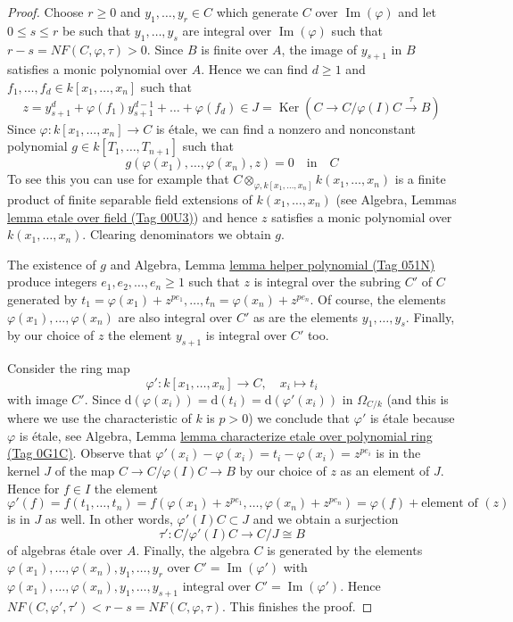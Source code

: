 \documentclass{amsart}
\theoremstyle{plain}
\theoremstyle{definition}
\theoremstyle{remark}
\numberwithin{equation}{subsection}
\def\Ker{\mathop{\mathrm{Ker}}}
\def\Im{\mathop{\mathrm{Im}}}
\begin{document}
\begin{proof}
Choose $r \geq 0$ and $y_1, \ldots, y_r \in C$ which generate
$C$ over $\Im(\varphi)$ and let $0 \leq s \leq r$ be such that
$y_1, \ldots, y_s$ are integral over $\Im(\varphi)$
such that $r - s = NF(C, \varphi, \tau) > 0$.
Since $B$ is finite over $A$, the image of $y_{s + 1}$ in $B$
satisfies a monic polynomial over $A$. Hence we can find
$d \geq 1$ and $f_1, \ldots, f_d \in k[x_1, \ldots, x_n]$
such that
$$
z = y_{s + 1}^d + \varphi(f_1) y_{s + 1}^{d - 1} + \ldots + \varphi(f_d) \in
J = \Ker(C \to C/\varphi(I)C \xrightarrow{\tau} B)
$$
Since $\varphi : k[x_1, \ldots, x_n] \to C$ is \'etale, we can find a
nonzero and nonconstant polynomial $g \in k[T_1, \ldots, T_{n + 1}]$
such that
$$
g(\varphi(x_1), \ldots, \varphi(x_n), z) = 0
\quad\text{in}\quad
C
$$
To see this you can use for example that
$C \otimes_{\varphi, k[x_1, \ldots, x_n]} k(x_1, \ldots, x_n)$
is a finite product of finite separable field extensions
of $k(x_1, \ldots, x_n)$
(see Algebra, Lemmas \href{https://stacks.math.columbia.edu/tag/00U3}{lemma etale over field (Tag 00U3)})
and hence $z$ satisfies a monic
polynomial over $k(x_1, \ldots, x_n)$. Clearing denominators
we obtain $g$.

\medskip\noindent
The existence of $g$ and
Algebra, Lemma \href{https://stacks.math.columbia.edu/tag/051N}{lemma helper polynomial (Tag 051N)}
produce integers $e_1, e_2, \ldots, e_n \geq 1$ such that
$z$ is integral over the subring $C'$ of $C$ generated by
$t_1 = \varphi(x_1) + z^{pe_1}, \ldots, t_n = \varphi(x_n) + z^{pe_n}$.
Of course, the elements $\varphi(x_1), \ldots, \varphi(x_n)$
are also integral over $C'$ as are the elements
$y_1, \ldots, y_s$. Finally, by our choice of $z$ the element
$y_{s + 1}$ is integral over $C'$ too.

\medskip\noindent
Consider the ring map
$$
\varphi' : k[x_1, \ldots, x_n] \longrightarrow C, \quad
x_i \longmapsto t_i
$$
with image $C'$. Since
$\text{d}(\varphi(x_i)) = \text{d}(t_i) = \text{d}(\varphi'(x_i))$
in $\Omega_{C/k}$ (and this is where we use the characteristic of $k$
is $p > 0$) we conclude that $\varphi'$ is \'etale because $\varphi$ is
\'etale, see
Algebra, Lemma \href{https://stacks.math.columbia.edu/tag/0G1C}{lemma characterize etale over polynomial ring (Tag 0G1C)}.
Observe that $\varphi'(x_i) - \varphi(x_i) = t_i - \varphi(x_i) = z^{pe_i}$
is in the kernel $J$ of the map $C \to C/\varphi(I)C \to B$ by our
choice of $z$ as an element of $J$.
Hence for $f \in I$ the element
$$
\varphi'(f) =
f(t_1, \ldots, t_n) =
f(\varphi(x_1) + z^{pe_1}, \ldots, \varphi(x_n) + z^{pe_n}) =
\varphi(f) + \text{element of }(z)
$$
is in $J$ as well. In other words, $\varphi'(I)C \subset J$ and
we obtain a surjection
$$
\tau' : C/\varphi'(I)C \longrightarrow C/J \cong B
$$
of algebras \'etale over $A$. Finally, the algebra
$C$ is generated by the elements
$\varphi(x_1), \ldots, \varphi(x_n), y_1, \ldots, y_r$
over $C' = \Im(\varphi')$ with
$\varphi(x_1), \ldots, \varphi(x_n), y_1, \ldots, y_{s + 1}$
integral over $C' = \Im(\varphi')$. Hence
$NF(C, \varphi', \tau') < r - s = NF(C, \varphi, \tau)$.
This finishes the proof.
\end{proof}
\end{document}
